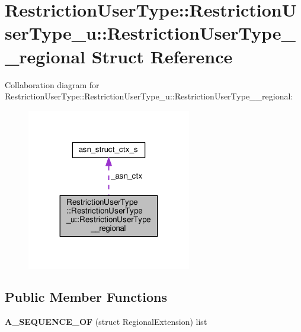 \hypertarget{structRestrictionUserType_1_1RestrictionUserType__u_1_1RestrictionUserType____regional}{}\section{Restriction\+User\+Type\+:\+:Restriction\+User\+Type\+\_\+u\+:\+:Restriction\+User\+Type\+\_\+\+\_\+regional Struct Reference}
\label{structRestrictionUserType_1_1RestrictionUserType__u_1_1RestrictionUserType____regional}


Collaboration diagram for Restriction\+User\+Type\+:\+:Restriction\+User\+Type\+\_\+u\+:\+:Restriction\+User\+Type\+\_\+\+\_\+regional\+:\nopagebreak
\begin{figure}[H]
\begin{center}
\leavevmode
\includegraphics[width=203pt]{structRestrictionUserType_1_1RestrictionUserType__u_1_1RestrictionUserType____regional__coll__graph}
\end{center}
\end{figure}
\subsection*{Public Member Functions}
\begin{DoxyCompactItemize}
\item 
{\bfseries A\+\_\+\+S\+E\+Q\+U\+E\+N\+C\+E\+\_\+\+OF} (struct Regional\+Extension) list\hypertarget{structRestrictionUserType_1_1RestrictionUserType__u_1_1RestrictionUserType____regional_a5e7a480154211d9322d185c46ddd2fdf}{}\label{structRestrictionUserType_1_1RestrictionUserType__u_1_1RestrictionUserType____regional_a5e7a480154211d9322d185c46ddd2fdf}

\end{DoxyCompactItemize}
